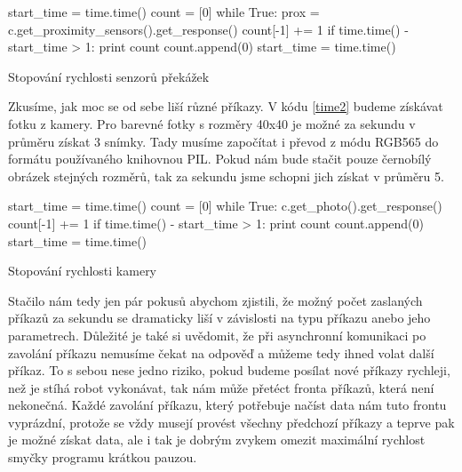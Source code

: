 \begin{listing}
\begin{pyc}
start_time = time.time()
count = [0]
while True:
    prox = c.get_proximity_sensors().get_response()
    count[-1] += 1
    if time.time() - start_time > 1:
        print count
        count.append(0)
        start_time = time.time()
\end{pyc}
\caption{Stopování rychlosti senzorů překážek}
\label{time1}
\end{listing}

    Zkusíme, jak moc se od sebe liší různé příkazy. V kódu \ref{time2} budeme
    získávat fotku z kamery. Pro barevné fotky s rozměry 40x40 je možné za
    sekundu v průměru získat 3 snímky. Tady musíme započítat i převod z módu
    RGB565 do formátu používaného knihovnou PIL. Pokud nám bude stačit pouze
    černobílý obrázek stejných rozměrů, tak za sekundu jsme schopni jich získat
    v průměru 5.

\begin{listing}
\begin{pyc}
start_time = time.time()
count = [0]
while True:
    c.get_photo().get_response()
    count[-1] += 1
    if time.time() - start_time > 1:
        print count
        count.append(0)
        start_time = time.time()
        \end{pyc}
\caption{Stopování rychlosti kamery}
\label{time2}
\end{listing}

    Stačilo nám tedy jen pár pokusů abychom zjistili, že možný počet zaslaných
    příkazů za sekundu se dramaticky liší v závislosti na typu příkazu anebo
    jeho parametrech. Důležité je také si uvědomit, že při asynchronní
    komunikaci po zavolání příkazu nemusíme čekat na odpověď a můžeme tedy
    ihned volat další příkaz. To s sebou nese jedno riziko, pokud budeme
    posílat nové příkazy rychleji, než je stíhá robot vykonávat, tak nám může
    přetéct fronta příkazů, která není nekonečná. Každé zavolání příkazu, který
    potřebuje načíst data nám tuto frontu vyprázdní, protože se vždy musejí
    provést všechny předchozí příkazy a teprve pak je možné získat data, ale i
    tak je dobrým zvykem omezit maximální rychlost smyčky programu krátkou
    pauzou.
